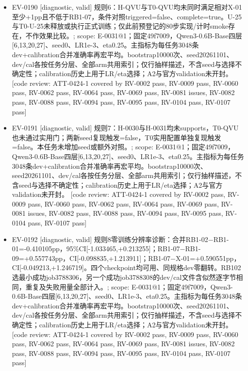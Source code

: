 \documentclass[11pt]{article}
\begin{document}
\begin{itemize}
\item EV-0190 [diagnostic, valid] 规则6：H-QVU与T0-QVU均未同时满足相对X-01至少+1pp且不低于RB1-07，条件对照triggered=false、complete=true。U-25与T0-U-25未释放或执行正式训练；仅此前预登记的80步实现/计时smoke存在，不作效果比较。; scope: E-0031@1；固定49f7009，Qwen3-0.6B-Base四层[6,13,20,27]、seed0、LR1e-3、eta0.25。主指标为每任务3048条dev+calibration合并准确率再宏平均。bootstrap10000次、seed20261101、dev/cal各按任务分层、全部arm共用索引；仅行抽样描述，不含seed与选择不确定性；calibration历史上用于LR/eta选择；A2与官方validation未开封。 [code review: ATT-0424-1 covered by RV-0002 pass, RV-0009 pass, RV-0060 pass, RV-0062 pass, RV-0064 pass, RV-0069 pass, RV-0081 issues, RV-0082 pass, RV-0088 pass, RV-0094 pass, RV-0095 pass, RV-0104 pass, RV-0107 pass]
\item EV-0191 [diagnostic, valid] 规则7：H-0030与H-0031均未supports，T0-QVU也未通过实用门；两新seed复现触发=false，T0实用配置单独复现触发=false。本任务未增加seed或额外对照。; scope: E-0031@1；固定49f7009，Qwen3-0.6B-Base四层[6,13,20,27]、seed0、LR1e-3、eta0.25。主指标为每任务3048条dev+calibration合并准确率再宏平均。bootstrap10000次、seed20261101、dev/cal各按任务分层、全部arm共用索引；仅行抽样描述，不含seed与选择不确定性；calibration历史上用于LR/eta选择；A2与官方validation未开封。 [code review: ATT-0424-1 covered by RV-0002 pass, RV-0009 pass, RV-0060 pass, RV-0062 pass, RV-0064 pass, RV-0069 pass, RV-0081 issues, RV-0082 pass, RV-0088 pass, RV-0094 pass, RV-0095 pass, RV-0104 pass, RV-0107 pass]
\item EV-0192 [diagnostic, valid] 规则8零训练分辨率诊断：合并RB1-02\ensuremath{-}RB1-01=-0.410105pp，95\%CI[-1.033465,+0.213255]；RB1-07\ensuremath{-}RB1-09=+0.557743pp，CI[-0.098835,+1.213911]；RB1-07\ensuremath{-}X-01=+0.590551pp，CI[-0.049213,+1.246719]。四个checkpoint均可用、同规格dev零翻转。RB102选最小成功job3788306，另一个成功job3788308的dev/cal文件含似然逐字节相同，重复及失败用量全部计入。; scope: E-0031@1；固定49f7009，Qwen3-0.6B-Base四层[6,13,20,27]、seed0、LR1e-3、eta0.25。主指标为每任务3048条dev+calibration合并准确率再宏平均。bootstrap10000次、seed20261101、dev/cal各按任务分层、全部arm共用索引；仅行抽样描述，不含seed与选择不确定性；calibration历史上用于LR/eta选择；A2与官方validation未开封。 [code review: ATT-0424-1 covered by RV-0002 pass, RV-0009 pass, RV-0060 pass, RV-0062 pass, RV-0064 pass, RV-0069 pass, RV-0081 issues, RV-0082 pass, RV-0088 pass, RV-0094 pass, RV-0095 pass, RV-0104 pass, RV-0107 pass]

\end{itemize}
\end{document}
